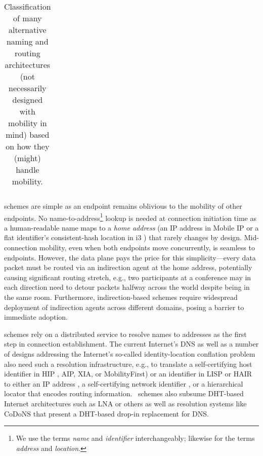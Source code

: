 {\begin{table*}[t]
{\begin{tabular}{|p{0.98in}|p{1.4in}|p{2.2in}|p{1.7in}|}
 \hline
\end{tabular}
}
\vspace{-0.15in}
\caption{Classification of many alternative naming and routing architectures (not necessarily designed with mobility in mind) based on how they (might) handle mobility.}
\vspace{-0.1in}
\label{tab:arch}
\end{table*}

}
{\textbf \Indirection} schemes are simple as an endpoint remains oblivious to the mobility of other endpoints. No name-to-address\footnote{We use the terms {\em name} and {\em identifier} interchangeably; likewise for the terms {\em address} and {\em location}.} lookup is needed at connection initiation time as a human-readable name maps to a {\em home address} (an IP address in Mobile IP \cite{MIP} or a flat identifier's consistent-hash location in i3 \cite{i3}) that rarely changes by design. Mid-connection mobility, even when both endpoints move concurrently, is seamless to endpoints. However, the data plane pays the price for this simplicity---every data packet must be routed via an indirection agent at the home address, potentially causing significant routing stretch, e.g., two participants at a conference may in each direction need to detour packets halfway across the world despite being in the same  room. %
Furthermore, indirection-based schemes require widespread deployment of indirection agents across different domains, posing a barrier to immediate adoption.

{\textbf \Logcen} schemes rely on a distributed service %
to resolve names to addresses as the first step in connection establishment. The current Internet's DNS as well as a number of designs addressing the Internet's so-called identity-location conflation problem also need such a resolution infrastructure, e.g., to translate a self-certifying host identifier in HIP \cite{HIP}, AIP\cite{AIP}, XIA\cite{XIA}, or MobilityFirst\cite{MobilityFirst-UMASS}) or an identifier in LISP \cite{LISP} or HAIR \cite{HAIR} to either an IP address \cite{HIP}, a self-certifying network identifier \cite{AIP,XIA,MobilityFirst-UMASS}, or a hierarchical locator \cite{HAIR} that encodes routing information. \Logcen\ schemes also subsume DHT-based Internet architectures such as LNA \cite{LNA} or others \cite{DOA,UIP} as well as resolution systems like CoDoNS \cite{codons-paper} that present a DHT-based drop-in replacement for DNS.


